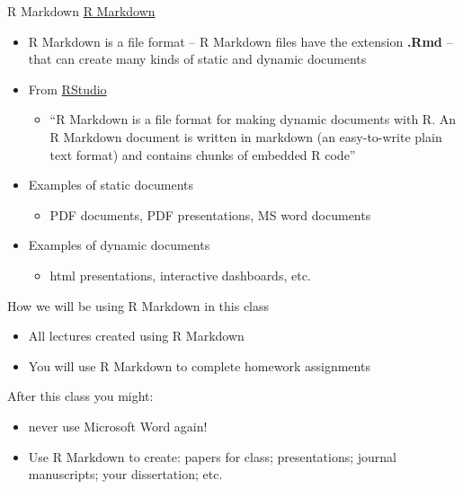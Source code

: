 \documentclass[
  8pt,
  ignorenonframetext,
  dvipsnames]{beamer}
\providecommand{\tightlist}{%
  \setlength{\itemsep}{0pt}\setlength{\parskip}{0pt}}
\renewcommand{\textbf}[1]{{\color{darkgray}\bfseries\fontfamily{Montserrat-TOsF}#1}}
\let\olditem\item
\renewcommand{\item}{%
  \olditem\vspace{4pt}
}
\begin{document}
\begin{frame}{R Markdown}
\protect\hypertarget{r-markdown}{}
\href{https://rmarkdown.rstudio.com/}{R Markdown}

\begin{itemize}
\tightlist
\item
  R Markdown is a file format -- R Markdown files have the extension
  \textbf{.Rmd} -- that can create many kinds of static and dynamic
  documents
\item
  From \href{https://rmarkdown.rstudio.com/articles_intro.html}{RStudio}

  \begin{itemize}
  \tightlist
  \item
    ``R Markdown is a file format for making dynamic documents with R.
    An R Markdown document is written in markdown (an easy-to-write
    plain text format) and contains chunks of embedded R code''
  \end{itemize}
\item
  Examples of static documents

  \begin{itemize}
  \tightlist
  \item
    PDF documents, PDF presentations, MS word documents
  \end{itemize}
\item
  Examples of dynamic documents

  \begin{itemize}
  \tightlist
  \item
    html presentations, interactive dashboards, etc.
  \end{itemize}
\end{itemize}

How we will be using R Markdown in this class

\begin{itemize}
\tightlist
\item
  All lectures created using R Markdown
\item
  You will use R Markdown to complete homework assignments
\end{itemize}

\medskip

After this class you might:

\begin{itemize}
\tightlist
\item
  never use Microsoft Word again!
\item
  Use R Markdown to create: papers for class; presentations; journal
  manuscripts; your dissertation; etc.
\end{itemize}
\end{frame}
\end{document}
